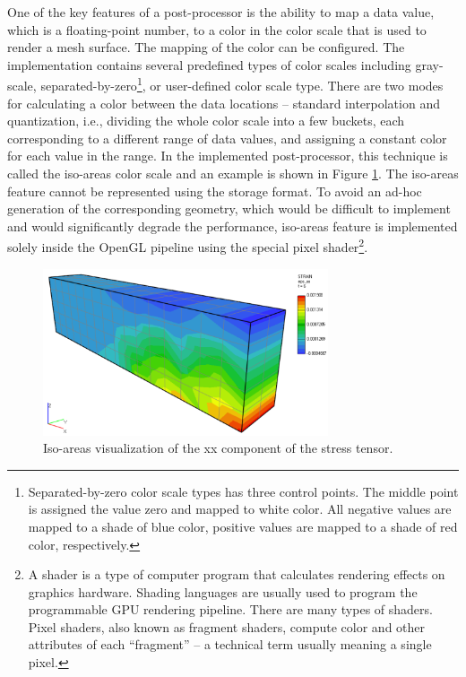 One of the key features of a post-processor is the ability to map a data value, which is a floating-point number, to a color in the color scale that is used to render a mesh surface. The mapping of the color can be configured. The implementation contains several predefined types of color scales including gray-scale, separated-by-zero\footnote{Separated-by-zero color scale types has three control points. The middle point is assigned the value zero and mapped to white color. All negative values are mapped to a shade of blue color, positive values are mapped to a shade of red color, respectively.}, or user-defined color scale type. There are two modes for calculating a color between the data locations -- standard interpolation and quantization, i.e., dividing the whole color scale into a few buckets, each corresponding to a different range of data values, and assigning a constant color for each value in the range. In the implemented post-processor, this technique is called the iso-areas color scale and an example is shown in Figure \ref{fig:beam-isoareas-shader}. The iso-areas feature cannot be represented using the storage format. To avoid an ad-hoc generation of the corresponding geometry, which would be difficult to implement and would significantly degrade the performance, iso-areas feature is implemented solely inside the OpenGL pipeline using the special pixel shader\footnote{A shader is a type of computer program that calculates rendering effects on graphics hardware. Shading languages are usually used to program the programmable GPU rendering pipeline. There are many types of shaders. Pixel shaders, also known as fragment shaders, compute color and other attributes of each ``fragment'' -- a technical term usually meaning a single pixel.}.


\begin{figure}[H]
    \centering
    \includegraphics[width=0.75\textwidth]{figures/chapter-data-management/beam-isoareas-shader}
    \decoRule
    \caption{Iso-areas visualization of the xx component of the stress tensor.}
    \label{fig:beam-isoareas-shader}
\end{figure}


